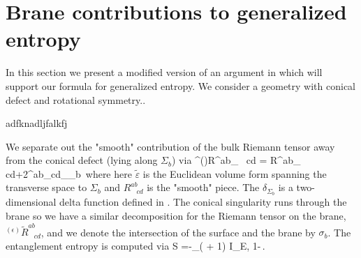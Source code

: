 %

\section{Brane contributions to generalized entropy}\label{sec:contributions}

In this section we present a modified version of an argument in \cite{Myers:2010tj} which will support our formula for generalized entropy. We consider a geometry with conical defect and rotational symmetry..

adfknadljfalkfj

We separate out the "smooth" contribution of the bulk Riemann tensor away from the conical defect (lying along $\Sigma_b$) via
\beq
^{(\epsilon)}R^{ab}_{\,\,\,\,\,cd} = R^{ab}_{\,\,\,\,\,cd}+2\pi \epsilon \tilde{\varepsilon}^{ab}\tilde{\varepsilon}_{cd}\delta_{\Sigma_b}\,
\eeq where here $\tilde{\varepsilon}$ is the Euclidean volume form spanning the transverse space to $\Sigma_b$ and $R^{ab}_{\,\,\,\,\,cd}$ is the "smooth" piece. The $\delta_{\Sigma_b}$ is a two-dimensional delta function defined in \cite{Myers:2010tj}. The conical singularity runs through the brane so we have a similar decomposition for the Riemann tensor on the brane, $^{(\epsilon)}\tilde{R}^{ab}_{\,\,\,\,\,cd}$, and we denote the intersection of the surface and the brane by $\sigma_b$. The entanglement entropy is computed via \cite{Myers:2010tj}
\beq\label{entropylimit}
S =-\lim_{\epsilon{}}\Big(\frac{\partial}{\partial \epsilon} + 1\Big) I_{E, 1-\epsilon}\,.
\eeq

